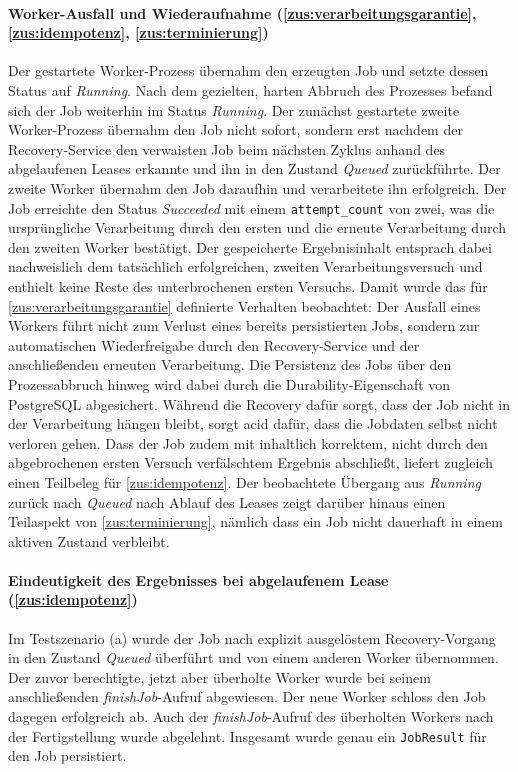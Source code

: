\paragraph{Worker-Ausfall und Wiederaufnahme (\ref{zus:verarbeitungsgarantie}, \ref{zus:idempotenz}, \ref{zus:terminierung})}
\label{erg:verarbeitungsgarantie}
Der gestartete Worker-Prozess übernahm den erzeugten Job und setzte dessen Status auf \textit{Running}.
Nach dem gezielten, harten Abbruch des Prozesses befand sich der Job weiterhin im Status \textit{Running}.
Der zunächst gestartete zweite Worker-Prozess übernahm den Job nicht sofort, sondern erst nachdem der Recovery-Service
den verwaisten Job beim nächsten Zyklus anhand des abgelaufenen Leases erkannte und ihn in den Zustand \textit{Queued} zurückführte.
Der zweite Worker übernahm den Job daraufhin und verarbeitete ihn erfolgreich.
Der Job erreichte den Status \textit{Succeeded} mit einem \texttt{attempt\_count} von zwei, was die ursprüngliche
Verarbeitung durch den ersten und die erneute Verarbeitung durch den zweiten Worker bestätigt.
Der gespeicherte Ergebnisinhalt entsprach dabei nachweislich dem tatsächlich erfolgreichen, zweiten Verarbeitungsversuch
und enthielt keine Reste des unterbrochenen ersten Versuchs.
Damit wurde das für \ref{zus:verarbeitungsgarantie} definierte Verhalten beobachtet: Der Ausfall eines Workers
führt nicht zum Verlust eines bereits persistierten Jobs, sondern zur automatischen Wiederfreigabe durch den Recovery-Service
und der anschließenden erneuten Verarbeitung.
Die Persistenz des Jobs über den Prozessabbruch hinweg wird dabei durch die Durability-Eigenschaft von PostgreSQL abgesichert.
Während die Recovery dafür sorgt, dass der Job nicht in der Verarbeitung hängen bleibt, sorgt \gls{acid} dafür, dass die
Jobdaten selbst nicht verloren gehen.
Dass der Job zudem mit inhaltlich korrektem, nicht durch den abgebrochenen ersten Versuch verfälschtem Ergebnis abschließt,
liefert zugleich einen Teilbeleg für \ref{zus:idempotenz}.
Der beobachtete Übergang aus \textit{Running} zurück nach \textit{Queued} nach Ablauf des Leases zeigt darüber hinaus einen
Teilaspekt von \ref{zus:terminierung}, nämlich dass ein Job nicht dauerhaft in einem aktiven Zustand verbleibt.

\paragraph{Eindeutigkeit des Ergebnisses bei abgelaufenem Lease (\ref{zus:idempotenz})}
\label{erg:idempotenz}
Im Testszenario (a) wurde der Job nach explizit ausgelöstem Recovery-Vorgang in den Zustand \textit{Queued} überführt
und von einem anderen Worker übernommen.
Der zuvor berechtigte, jetzt aber überholte Worker wurde bei seinem anschließenden \textit{finishJob}-Aufruf abgewiesen.
Der neue Worker schloss den Job dagegen erfolgreich ab.
Auch der \textit{finishJob}-Aufruf des überholten Workers nach der Fertigstellung wurde abgelehnt.
Insgesamt wurde genau ein \texttt{JobResult} für den Job persistiert.

